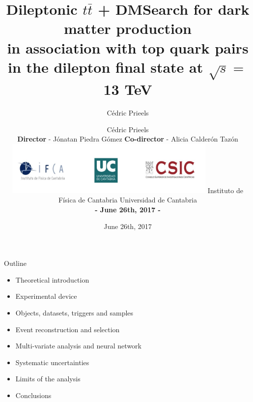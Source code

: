 \documentclass[handout,8 pt]{beamer}
\title{Dileptonic $t \bar t$ + DM}
\date{June 26th, 2017}
\author{C\'{e}dric Prieels}
\begin{document}
\begin{frame}
\vspace{-15pt} 
\title{Search for dark matter production \\ in association with top quark pairs \\ in the dilepton final state at $\sqrt{s} = $ 13 TeV}
\author{C\'{e}dric Prieels \\ \vspace{10pt} \textbf{Director} - J\'{o}natan Piedra G\'{o}mez \newline \textbf{Co-director} - Alicia Calder\'{o}n Taz\'{o}n \\ \vspace{5pt} \includegraphics[width= 0.78\textwidth]{figs/logos.jpg} \newline \vspace{5pt} Instituto de F\'{i}sica de Cantabria \newline Universidad de Cantabria \newline \vspace{5pt} \begin{center} \textbf{- June 26th, 2017 -} \end{center}}

\date{}
\vspace{15pt}
\maketitle

\centering
  
\end{frame}


\begin{frame}{Outline}

	\begin{itemize}
		\item Theoretical introduction \vfill
		\item Experimental device \vfill
		\item Objects, datasets, triggers and samples \vfill
		\item Event reconstruction and selection \vfill
		\item Multi-variate analysis and neural network \vfill
		\item Systematic uncertainties \vfill
		\item Limits of the analysis \vfill
		\item Conclusions \vfill
	\end{itemize}

\end{frame}
\end{document}
